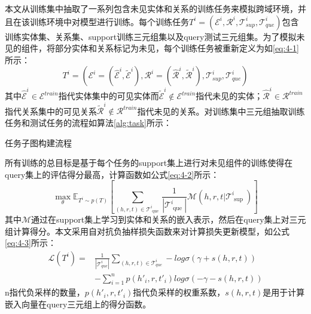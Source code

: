 本文从训练集中抽取了一系列包含未见实体和关系的训练任务来模拟跨域环境，并且在该训练环境中对模型进行训练。每个训练任务\(T^{i} = (\mathcal{E}^{i}, \mathcal{R}^{i}, \mathcal{T}^{i}_{sup},\mathcal{T}^{i}_{que})\)包含训练实体集、关系集、support训练三元组集以及query测试三元组集。为了模拟未见的组件，将部分实体和关系标记为未见，每个训练任务被重新定义为如\ref{eq:4-1}所示：
\begin{equation}
  T^{i} = (\mathcal{E}^{i} = (\hat{\mathcal{E}}^{i},\tilde{\mathcal{E}}^{i}), \mathcal{R}^{i} = (\hat{\mathcal{R}}^{i} ,\tilde{\mathcal{R}}^{i}   ), \mathcal{T}^{i}_{sup},\mathcal{T}^{i}_{que})  \label{eq:4-1}
\end{equation}
其中\(\hat{\mathcal{E}}^{i} \in \mathcal{E}^{train}\)指代实体集中的可见实体而\(\tilde{\mathcal{E}}^{i} \notin \mathcal{E}^{train}\)指代未见的实体；\(\hat{\mathcal{R}}^{i} \in \mathcal{R}^{train}\)指代关系集中的可见关系\(\tilde{\mathcal{R}}^{i} \notin \mathcal{R}^{train}\)指代未见的关系。对训练集中三元组抽取训练任务和测试任务的流程如算法\ref{alg:task}所示：
\begin{algorithm}
  \caption{任务子图构建流程}\label{alg:task}
\end{algorithm}

所有训练的总目标是基于每个任务的support集上进行对未见组件的训练使得在query集上的评估得分最高，计算函数如公式\ref{eq:4-2}所示：
\begin{equation}
  \max\limits_{ \theta } \mathbb{E} _ { T ^ { i } \sim p ( T ) } \left[ \sum\limits_{ ( h , r , t ) \in \mathcal{T} _ { \text { que } } ^ { i } } \frac { 1 } { | \mathcal{T} _ { \text { que } } ^ { i } | } \mathcal{M} ( h , r , t | \mathcal{T} _ { \text { sup } } ^ { i } ) \right] \label{eq:4-2}
\end{equation}
其中\(\mathcal{M}\)通过在support集上学习到实体和关系的嵌入表示，然后在query集上对三元组计算得分。本文采用自对抗负抽样损失函数来对计算损失更新模型，如公式\ref{eq:4-3}所示：
\begin{equation}
  \begin{aligned}
    \mathcal{L}(T^{i}) = &\frac{1}{|\mathcal{T}^{i}_{que}|} \sum\limits_{(h,r,t)\in\mathcal{T}^{i}_{que}}-log\sigma(\gamma + s(h,r,t)) \\
    &-\sum\limits_{i=1}^{n}p(h'_{i},r,t'_{i})log\sigma(-\gamma - s(h,r,t)) \label{eq:4-3}
  \end{aligned}
\end{equation}
n指代负采样的数量，\(p(h'_{i},r,t'_{i})\)指代负采样的权重系数，\(s(h,r,t)\)是用于计算嵌入向量在query三元组上的得分函数。

